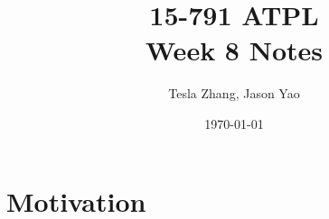 \documentclass[letterpaper]{article}
\title{15-791 ATPL \\ Week 8 Notes}
\author{Tesla Zhang, Jason Yao}
\date{\today}
\begin{document}
\maketitle

\usepackage{newunicodechar}

\section{Motivation}
\end{document}
